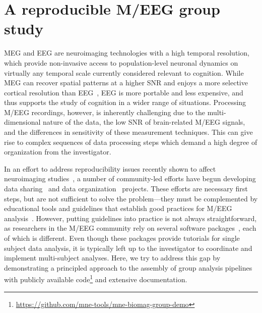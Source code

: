 \section{A reproducible M/EEG group study}
\label{sec:group_study_intro}


\Ac{MEG} and \ac{EEG} are neuroimaging technologies with a high temporal resolution, which provide non-invasive access to population-level neuronal dynamics on virtually any temporal scale currently considered relevant to cognition. %
While MEG can recover spatial patterns at a higher \ac{SNR} and enjoys a more selective cortical resolution than \ac{EEG}~\citep{baillet17}, EEG is more portable and less expensive, and thus supports the study of cognition in a wider range of situations. Processing M/EEG recordings, however, is inherently challenging due to the multi-dimensional nature of the data, the low \ac{SNR} of brain-related M/EEG signals, and the differences in sensitivity of these measurement techniques. This can give rise to complex sequences of data processing steps which demand a high degree of organization from the investigator.

In an effort to address reproducibility issues recently shown to affect neuroimaging studies~\citep{ioannidis2005most, button2013power,Carp2012,Carp2012289}, a number of community-led efforts have begun developing data sharing~\citep{poldrack2017openfmri} and data organization~\citep{gorgolewski2016brain, galan2017meg} projects. These efforts are necessary first steps, but are not sufficient to solve the problem---they must be complemented by educational tools and guidelines that establish good practices for M/EEG analysis~\citep{gross-etal:13}. However, putting guidelines into practice is not always straightforward, as researchers in the M/EEG community rely on several software packages~\citep{tadel2011brainstorm,delorme2004eeglab,eeglab2,
oostenveld2010fieldtrip,nutmeg,litvak2011eeg}, each of which is different. Even though these packages provide tutorials for single subject data analysis, it is typically left up to the investigator to coordinate and implement multi-subject analyses. Here, we try to address this gap by demonstrating a principled approach to the assembly of group analysis pipelines with publicly available code\footnote{\url{https://github.com/mne-tools/mne-biomag-group-demo}} and extensive documentation. 

